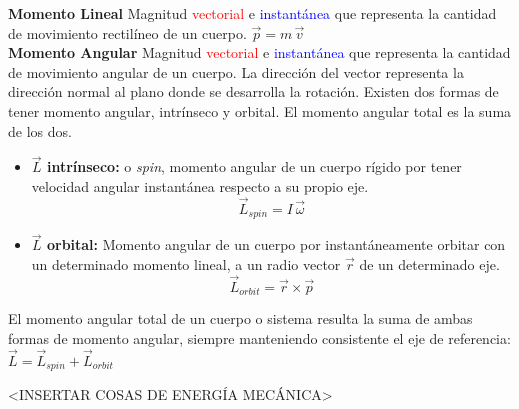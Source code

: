 \documentclass[12pt,a4paper]{article}
\begin{document}
\textbf{Momento Lineal} Magnitud \textcolor{red}{vectorial} e \textcolor{blue}{instantánea} que representa la cantidad de movimiento rectilíneo de un cuerpo. $\displaystyle \vec{p}=m \, \vec{v}$ \\

\textbf{Momento Angular} Magnitud \textcolor{red}{vectorial} e \textcolor{blue}{instantánea} que representa la cantidad de movimiento angular de un cuerpo. La dirección del vector representa la dirección normal al plano donde se desarrolla la rotación.
Existen dos formas de tener momento angular, intrínseco y orbital. El momento angular total es la suma de los dos.

\begin{itemize}
	\item \textbf{$\vec{L}$ intrínseco:} o \textit{spin}, momento angular de un cuerpo rígido por tener velocidad angular instantánea respecto a su propio eje. $$\vec{L}_{spin} = I \, \vec{\omega}$$

	\item \textbf{$\vec{L}$ orbital:} Momento angular de un cuerpo por instantáneamente orbitar con un determinado momento lineal, a un radio vector $\vec{r}$ de un determinado eje. $$\vec{L}_{orbit} = \vec{r} \times \vec{p}$$
\end{itemize}

El momento angular total de un cuerpo o sistema resulta la suma de ambas formas de momento angular, siempre manteniendo consistente el eje de referencia: $\displaystyle \vec{L}=\vec{L}_{spin}+\vec{L}_{orbit}$


<INSERTAR COSAS DE ENERGÍA MECÁNICA>
\end{document}
